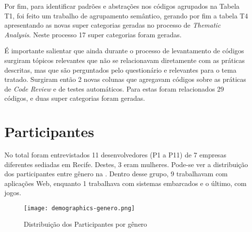 
Por fim, para identificar padrões e abstrações nos códigos agrupados na Tabela T1, foi feito um trabalho de agrupamento semântico, gerando por fim a tabela T4 apresentando as novas super categorias geradas no processo de \emph{Thematic Analysis}. Neste processo 17 super categorias foram geradas.

É importante salientar que ainda durante o processo de levantamento de códigos surgiram tópicos relevantes que não se relacionavam diretamente com as práticas descritas, mas que são perguntados pelo questionário e relevantes para o tema tratado. Surgiram então 2 novas colunas que agregavam códigos sobre as práticas de \emph{Code Review} e de testes automáticos. Para estas foram relacionados 29 códigos, e duas super categorias foram geradas.



\section{Participantes}

No total foram entrevistados 11 desenvolvedores (P1 a P11) de 7 empresas diferentes sediadas em Recife. Destes, 3 eram mulheres. Pode-se ver a distribuição dos participantes entre gênero na . Dentro desse grupo, 9 trabalhavam com aplicações Web, enquanto 1 trabalhava com sistemas embarcados e o último, com jogos.

\begin{figure}[ht]
\begin{center}
\texttt{[image: demographics-genero.png]}
\end{center}
\caption[Distribuição dos Participantes por gênero]{
    Distribuição dos Participantes por gênero
}\label{genero}
\end{figure}

